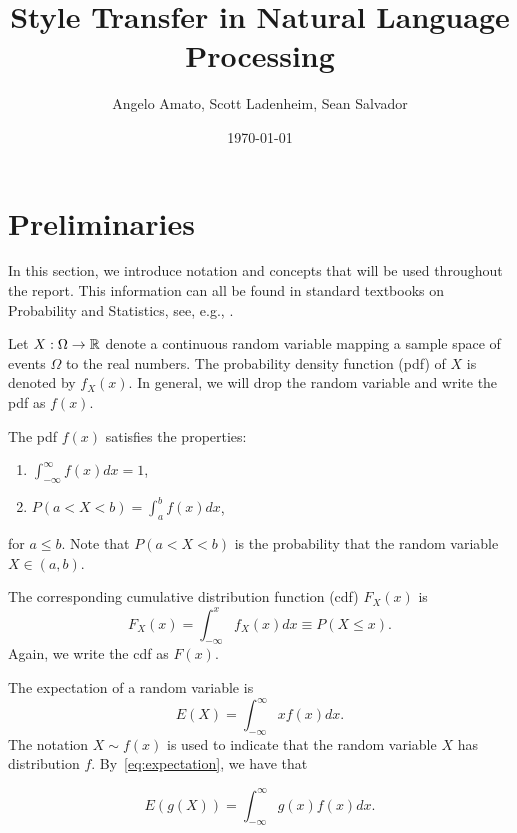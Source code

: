\documentclass[11pt]{article}
\begin{document}
\title{Style Transfer in Natural Language Processing}
\author{Angelo Amato, Scott Ladenheim, Sean Salvador}
\date{\today}
\maketitle

\section{Preliminaries}

In this section, we introduce notation and concepts that will be used throughout the report. This information can all be found in standard textbooks on Probability and Statistics, see, e.g., \cite{degroot_probability_2012, wasserman_all_2004}.

Let $X: \Omega \rightarrow \mathbb{R}$ denote a continuous random variable mapping a sample space of events $\Omega$ to the real numbers. The probability density function (pdf) of $X$ is denoted by $f_X(x)$. In general, we will drop the random variable and write the pdf as $f(x)$. 

The pdf $f(x)$ satisfies the properties:
\begin{enumerate}
\item $\int_{-\infty}^{\infty}f(x)dx =1$,
\item $P(a < X < b) = \int_{a}^{b}f(x)dx$,
\end{enumerate}
for $a\leq b$. Note that $P(a < X < b)$ is the probability that the random variable $X\in(a, b)$.

The corresponding cumulative distribution function (cdf) $F_{X}(x)$ is
\begin{equation}
F_{X}(x) = \int_{-\infty}^{x}f_{X}(x)dx \equiv P(X \leq x).
\end{equation}
Again, we write the cdf as $F(x)$.

The expectation of a random variable is
\begin{equation}
    E(X) = \int_{-\infty}^{\infty}xf(x)dx.
    \label{eq:expectation}
\end{equation}
The notation $X\sim f(x)$ is used to indicate that the random variable $X$ has distribution $f$. By~\eqref{eq:expectation}, we have that 

\begin{equation}
    E(g(X)) = \int_{-\infty}^{\infty}g(x)f(x)dx.
\end{equation}
\end{document}
